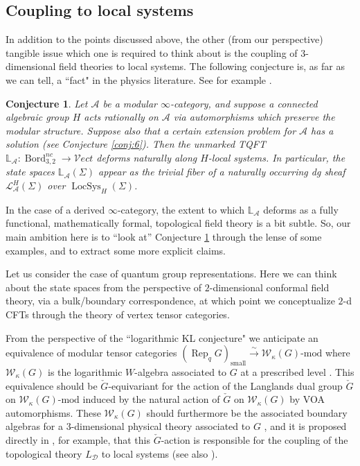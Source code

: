 \documentclass[reqno]{amsart}
\newtheorem{conjecture}[lemma]{Conjecture}
\theoremstyle{definition}
\newcommand{\mbb}[1]{\mathbb{#1}}
\newcommand{\mcl}[1]{\mathcal{#1}}
\newcommand{\msc}[1]{\mathscr{#1}}
\newcommand{\opn}[1]{\operatorname{#1}}
\newcommand{\Vect}{\msc{V}\!ect}
\DeclareMathOperator{\Rep}{Rep}
\DeclareMathOperator{\Bord}{Bord}
\renewcommand{\1}{\mathbf{1}}
\begin{document}
\subsection{Coupling to local systems}
\label{sect:locsys}

In addition to the points discussed above, the other (from our perspective) tangible issue which one is required to think about is the coupling of $3$-dimensional field theories to local systems. The following conjecture is, as far as we can tell, a ``fact" in the physics literature. See for example \cite{marcus95,gaiotto19}.

\begin{conjecture}\label{conj:5}
Let $\msc{A}$ be a modular $\infty$-category, and suppose a connected algebraic group $H$ acts rationally on $\msc{A}$ via automorphisms which preserve the modular structure. Suppose also that a certain extension problem for $\msc{A}$ has a solution (see Conjecture \ref{conj:6}). Then the unmarked TQFT $\mbb{L}_{\msc{A}}:\Bord_{3,2}^{nc}\to \Vect$ deforms naturally along $H$-local systems. In particular, the state spaces $\mbb{L}_{\msc{A}}(\Sigma)$ appear as the trivial fiber of a naturally occurring dg sheaf $\mcl{L}^H_{\msc{A}}(\Sigma)$ over $\opn{LocSys}_H(\Sigma)$. 
\end{conjecture}

In the case of a derived $\infty$-category, the extent to which $\mbb{L}_{\msc{A}}$ deforms as a fully functional, mathematically formal, topological field theory is a bit subtle. So, our main ambition here is to ``look at'' Conjecture \ref{conj:5} through the lense of some examples, and to extract some more explicit claims.

Let us consider the case of quantum group representations.  Here we can think about the state spaces from the perspective of $2$-dimensional conformal field theory, via a bulk/boundary correspondence, at which point we conceptualize $2$-d CFTs through the theory of vertex tensor categories.
\par

From the perspective of the ``logarithmic KL conjecture" we anticipate an equivalence of modular tensor categories $(\Rep_qG)_{\opn{small}}\overset{\sim}\to \mcl{W}_{\kappa}(G)\text{-mod}$ where $\mcl{W}_{\kappa}(G)$ is the logarithmic $W$-algebra associated to $G$ at a prescribed level \cite{lentner21,sugimoto21,lisugimoto}. This equivalence should be $\check{G}$-equivariant for the action of the Langlands dual group $\check{G}$ on $\mcl{W}_{\kappa}(G)\text{-mod}$ induced by the natural action of $\check{G}$ on $\mcl{W}_{\kappa}(G)$ by VOA automorphisms. These $\mcl{W}_{\kappa}(G)$ should furthermore be the associated boundary algebras for a $3$-dimensional physical theory associated to $G$ \cite[Section 6.2.2]{creutzigetal24}, and it is proposed directly in \cite[Section 2.1]{gaiotto19}, for example, that this $\check{G}$-action is responsible for the coupling of the topological theory $L_{\msc{D}}$ to local systems (see also \cite{feiginlentner}).
\par
\end{document}
